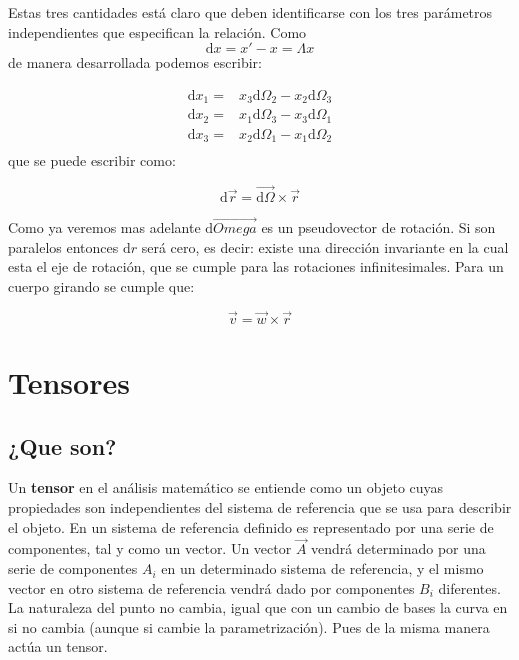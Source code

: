 \documentclass[12pt,a4paper]{book}
\newcommand{\D}{\mathrm{d}}
\begin{document}
Estas tres cantidades está claro que deben identificarse con los tres parámetros independientes que especifican la relación. Como $$\D x = x' - x = \Lambda x$$ de manera desarrollada podemos escribir:

\begin{equation}
\begin{array}{ll}
\D x_1 = & x_3 \D \Omega_2 - x_2 \D \Omega_3 \\
\D x_2 = &  x_1 \D \Omega_3 - x_3 \D \Omega_1 \\
\D x_3 = &  x_2 \D \Omega_1 - x_1 \D \Omega_2 \\
\end{array}
\end{equation}
que se puede escribir como:

\begin{equation}
\D \vec{r} =  \vec{\D \Omega} \times \vec{r} 
\end{equation}

Como ya veremos mas adelante $\D \vec{Omega}$ es un pseudovector de rotación. Si son paralelos entonces $\D r$ será cero, es decir: existe una dirección invariante en la cual esta el eje de rotación, que se cumple para las rotaciones infinitesimales. Para un cuerpo girando se cumple que:

\begin{equation}
\vec{v} = \vec{w} \times \vec{r}
\end{equation}


\section{Tensores}

\subsection{¿Que son?}

Un \textbf{tensor} en el análisis matemático se entiende como un objeto cuyas propiedades son independientes del sistema de referencia que se usa para describir el objeto. En un sistema de referencia definido es representado por una serie de componentes, tal y como un vector. Un vector $\vec{A}$ vendrá determinado por una serie de componentes $A_i$ en un determinado sistema de referencia, y el mismo vector en otro sistema de referencia vendrá dado por componentes $B_i$ diferentes. La naturaleza del punto no cambia, igual que con un cambio de bases la curva en si no cambia (aunque si cambie la parametrización). Pues de la misma manera actúa un tensor. \\
\end{document}

